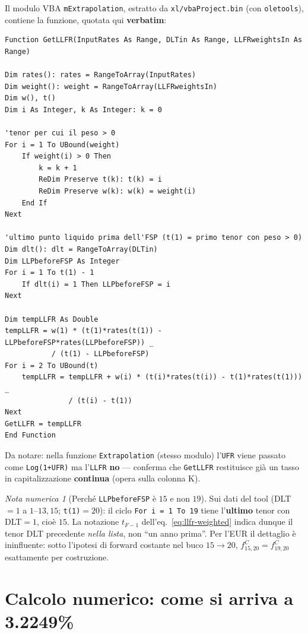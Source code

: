 \documentclass[11pt,a4paper]{article}
\theoremstyle{definition}
\theoremstyle{remark}
\newtheorem*{attenzione}{Nota numerica}
\begin{document}
Il modulo VBA \texttt{mExtrapolation}, estratto da \texttt{xl/vbaProject.bin} (con
\texttt{oletools}), contiene la funzione, quotata qui \textbf{verbatim}:

\begin{Verbatim}[fontsize=\small,frame=single]
Function GetLLFR(InputRates As Range, DLTin As Range, LLFRweightsIn As Range)

Dim rates(): rates = RangeToArray(InputRates)
Dim weight(): weight = RangeToArray(LLFRweightsIn)
Dim w(), t()
Dim i As Integer, k As Integer: k = 0

'tenor per cui il peso > 0
For i = 1 To UBound(weight)
    If weight(i) > 0 Then
        k = k + 1
        ReDim Preserve t(k): t(k) = i
        ReDim Preserve w(k): w(k) = weight(i)
    End If
Next

'ultimo punto liquido prima dell'FSP (t(1) = primo tenor con peso > 0)
Dim dlt(): dlt = RangeToArray(DLTin)
Dim LLPbeforeFSP As Integer
For i = 1 To t(1) - 1
    If dlt(i) = 1 Then LLPbeforeFSP = i
Next

Dim tempLLFR As Double
tempLLFR = w(1) * (t(1)*rates(t(1)) - LLPbeforeFSP*rates(LLPbeforeFSP)) _
           / (t(1) - LLPbeforeFSP)
For i = 2 To UBound(t)
    tempLLFR = tempLLFR + w(i) * (t(i)*rates(t(i)) - t(1)*rates(t(1))) _
               / (t(i) - t(1))
Next
GetLLFR = tempLLFR
End Function
\end{Verbatim}

Da notare: nella funzione \texttt{Extrapolation} (stesso modulo) l'\texttt{UFR} viene passato
come \texttt{Log(1+UFR)} ma l'\texttt{LLFR} \textbf{no} --- conferma che \texttt{GetLLFR}
restituisce gi\`a un tasso in capitalizzazione \textbf{continua} (opera sulla colonna K).

\begin{attenzione}[Perché \texttt{LLPbeforeFSP} \`e $15$ e non $19$]
\label{oss:tf-1}
Sui dati del tool (DLT$=1$ a $1$--$13,15$; \texttt{t(1)}$=20$): il ciclo
\texttt{For i = 1 To 19} tiene l'\textbf{ultimo} tenor con DLT$=1$, cio\`e $15$. La notazione
$t_{F-1}$ dell'eq.~\eqref{eq:llfr-weighted} indica dunque il tenor DLT precedente
\emph{nella lista}, non ``un anno prima''. Per l'EUR il dettaglio \`e ininfluente: sotto
l'ipotesi di forward costante nel buco $15\!\to\!20$, $f^C_{15,20}=f^C_{19,20}$ esattamente
per costruzione.
\end{attenzione}

\section{Calcolo numerico: come si arriva a 3.2249\%}
\label{sec:calcolo}
\end{document}
